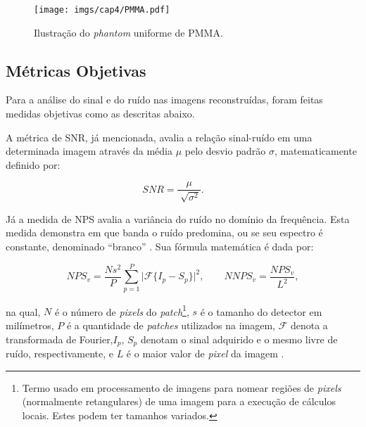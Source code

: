  \begin{figure}[htb]
	\caption{Ilustração do \textit{phantom} uniforme de \acs{PMMA}.}
	\begin{center}
		\texttt{[image: imgs/cap4/PMMA.pdf]}
	\end{center}
	\label{fig:imgCap4PMMA}
\end{figure} 


\subsection{Métricas Objetivas} 

Para a análise do sinal e do ruído nas imagens reconstruídas, foram feitas medidas objetivas como as descritas abaixo.


A métrica de \acs{SNR}, já mencionada, avalia a relação sinal-ruído em uma determinada imagem através da média $\mu$ pelo desvio padrão $\sigma$, matematicamente definido por: 

 \begin{equation}
 SNR = \dfrac{\mu}{\sqrt[]{\sigma^{2}}}.    	\qquad 
 \label{eq:eqSNR}
 \end{equation}
 
 Já a medida de \acs{NPS} avalia a variância do ruído no domínio da frequência. Esta medida demonstra em que banda o ruído predomina, ou se seu espectro é constante, denominado ``branco'' \cite{bertalmiodenoising2018}. Sua fórmula matemática é dada por:
 
 \begin{equation}
 NPS_{v} = \dfrac{Ns^{2}}{P} \sum_{p=1}^{P}  \vert \mathcal{F}\{I_{p}-S_{p}\}\vert^{2},    	\qquad 
 NNPS_{v} = \dfrac{NPS_{v}}{L^{2}},	 
 \label{eq:eqNNPS}
 \end{equation}

\noindent na qual, $N$ é o número de \textit{pixels} do \textit{patch}\footnote{ Termo usado em processamento de imagens para nomear regiões de \textit{pixels} (normalmente retangulares) de uma imagem para a execução de cálculos locais. Estes podem ter tamanhos variados.}, $s$ é o tamanho do detector em milímetros, $P$ é a quantidade de \textit{patches} utilizados na imagem, $\mathcal{F}$  denota a transformada de Fourier,$I_{p}$, $S_{p}$ denotam o sinal adquirido e o mesmo livre de ruído, respectivamente, e $L$ é o maior valor de \textit{pixel} da imagem \cite{dobbins2000handbook}.

